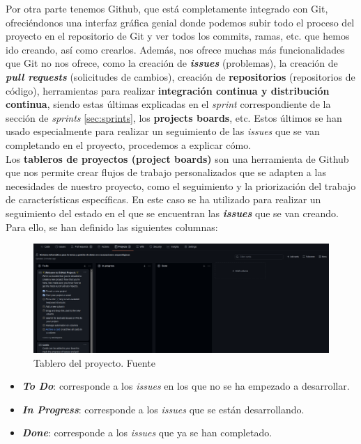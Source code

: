 Por otra parte tenemos Github, que está completamente integrado con Git, ofreciéndonos una
interfaz gráfica genial donde podemos subir todo el proceso del proyecto en el repositorio
de Git y ver todos los commits, ramas, etc. que hemos ido creando, así como crearlos.
Además, nos ofrece muchas más funcionalidades que Git no nos ofrece, como la creación de
\textbf{\textit{issues}} (problemas), la creación de \textbf{\textit{pull requests}}
(solicitudes de cambios), creación de \textbf{repositorios} (repositorios de código),
herramientas para realizar \textbf{integración continua y distribución continua}, siendo
estas últimas explicadas en el \textit{sprint} correspondiente de la sección de
\textit{sprints} \ref{sec:sprints}, los \textbf{projects boards}, etc. Estos últimos se han
usado especialmente para realizar un seguimiento de las \textit{issues} que se van
completando en el proyecto, procedemos a explicar cómo.\\

Los \textbf{tableros de proyectos (project boards)} \cite{project-boards} son una
herramienta de Github que nos permite crear flujos de trabajo personalizados que se adapten
a las necesidades de nuestro proyecto, como el seguimiento y la priorización del trabajo de
características específicas. En este caso se ha utilizado para realizar un seguimiento
del estado en el que se encuentran las \textbf{\textit{issues}} que se van creando. Para
ello, se han definido las siguientes columnas:

    \begin{figure}[H]
        \centering
        \includegraphics[scale=0.19]{imagenes/project-board.png}
        \caption[Tablero del proyecto]{Tablero del proyecto. Fuente \cite{project-board-image}}
        \label{fig:project-board}
    \end{figure}

    \begin{itemize}
        \item \textbf{\textit{To Do}}: corresponde a los \textit{issues} en los que no se ha
        empezado a desarrollar.
        \item \textbf{\textit{In Progress}}: corresponde a los \textit{issues} que se están
        desarrollando.
        \item \textbf{\textit{Done}}: corresponde a los \textit{issues} que ya se han
        completado.
    \end{itemize}

